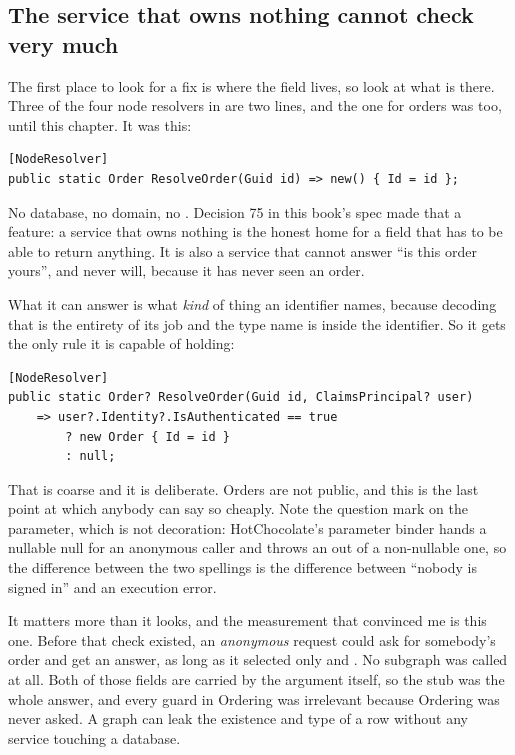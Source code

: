 \subsection*{The service that owns nothing cannot check very much}

%
The first place to look for a fix is where the field lives, so look at what is
there. Three of the four node resolvers in  are two lines,
and the one for orders was too, until this chapter. It was this:

\begin{verbatim}
[NodeResolver]
public static Order ResolveOrder(Guid id) => new() { Id = id };
\end{verbatim}

No database, no domain, no . Decision 75 in this book's spec
made that a feature: a service that owns nothing is the honest home for a field
that has to be able to return anything. It is also a service that cannot answer
\enquote{is this order yours}, and never will, because it has never seen an
order.

What it can answer is what \emph{kind} of thing an identifier names, because
decoding that is the entirety of its job and the type name is inside the
identifier. So it gets the only rule it is capable of holding:

\begin{verbatim}
[NodeResolver]
public static Order? ResolveOrder(Guid id, ClaimsPrincipal? user)
    => user?.Identity?.IsAuthenticated == true
        ? new Order { Id = id }
        : null;
\end{verbatim}

%
That is coarse and it is deliberate. Orders are not public, and this is the last
point at which anybody can say so cheaply. Note the question mark on the
parameter, which is not decoration: HotChocolate's parameter binder hands a
nullable  null for an anonymous caller and throws an
 out of a non-nullable one, so the difference between
the two spellings is the difference between \enquote{nobody is signed in} and an
execution error.

%
It matters more than it looks, and the measurement that convinced me is this
one. Before that check existed, an \emph{anonymous} request could ask
 for somebody's order and get an answer, as long as it selected
only  and . No subgraph was called at all. Both of
those fields are carried by the argument itself, so the stub was the whole
answer, and every guard in Ordering was irrelevant because Ordering was never
asked. A graph can leak the existence and type of a row without any service
touching a database.


